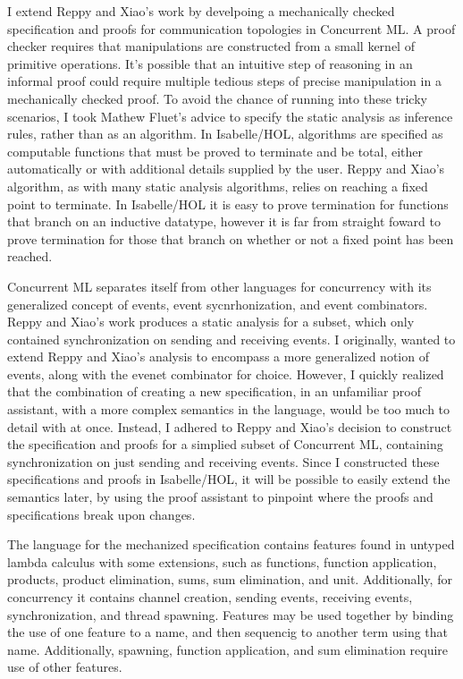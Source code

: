 \documentclass[letterpaper, 11pt]{extarticle}
\begin{document}
I extend Reppy and Xiao's work by develpoing a mechanically checked specification and proofs
for communication topologies in Concurrent ML. A proof checker requires that manipulations are
constructed from a small kernel of primitive operations. It's possible that an intuitive step of reasoning in an
informal proof could require multiple tedious steps of precise manipulation in a mechanically checked proof.
To avoid the chance of running into these tricky scenarios, I took Mathew Fluet's advice to specify the static analysis
as inference rules, rather than as an algorithm. In Isabelle/HOL, algorithms are specified as computable functions
that must be proved to terminate and be total, either automatically or with additional details supplied by the user.
Reppy and Xiao's algorithm, as with many static analysis algorithms, relies on reaching a fixed point to terminate.
In Isabelle/HOL it is easy to prove termination for functions that branch on an inductive datatype, however
it is far from straight foward to prove termination for those that branch on
whether or not a fixed point has been reached.

Concurrent ML separates itself from other languages for concurrency with its generalized concept of events,
event sycnrhonization, and event combinators.  Reppy and Xiao's work produces a static analysis for a subset,
which only contained synchronization on sending and receiving events.  I originally, wanted to extend Reppy and Xiao's
analysis to encompass a more generalized notion of events, along with the evenet combinator for choice.
However, I quickly
realized that the combination of creating a new specification, in an unfamiliar proof assistant, with a more complex
semantics in the language, would be too much to detail with at once.  Instead, I adhered to Reppy and Xiao's decision
to construct the specification and proofs for a simplied subset of Concurrent ML, containing synchronization on just
sending and receiving events. Since I constructed these specifications and proofs in Isabelle/HOL, it will be possible
to easily extend the semantics later, by using the proof assistant to pinpoint where the proofs and
specifications break upon changes.

The language for the mechanized specification contains features found in untyped lambda calculus with
some extensions, such as functions, function application, products, product elimination, sums, sum elimination, and unit. 
Additionally, for concurrency it contains channel creation, sending events, receiving events, synchronization,
and thread spawning. Features may be used together by binding the use of one feature to a name, and then
sequencig to another term using that name. Additionally, spawning, function application, and sum elimination require
use of other features.
\end{document}
